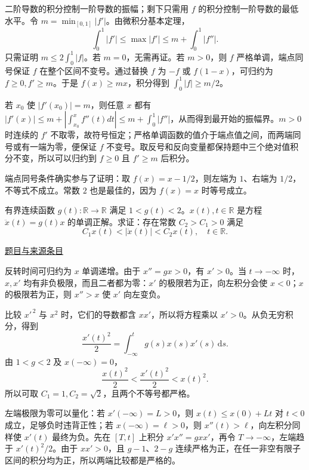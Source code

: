 \documentclass[UTF8,12pt,a4paper,fontset=fandol]{ctexart}
\begin{document}
\begin{solve}\label{ans:fin09-hi:7}

二阶导数的积分控制一阶导数的振幅；剩下只需用 $f$ 的积分控制一阶导数的最低水平。令 $m=\min_{[0,1]}|f'|$。由微积分基本定理，
\[
\int_0^1|f'|\leq\max|f'|\leq m+\int_0^1|f''|.
\]
只需证明 $m\leq2\int_0^1|f|$。若 $m=0$，无需再证。若 $m>0$，则 $f$ 严格单调，端点同号保证 $f$ 在整个区间不变号。通过替换 $f$ 为 $-f$ 或 $f(1-x)$，可归约为 $f\geq0,f'\geq m$。于是 $f(x)\geq mx$，积分得到 $\int_0^1|f|\geq m/2$。

若 $x_0$ 使 $|f'(x_0)|=m$，则任意 $x$ 都有 $|f'(x)|\le m+|\int_{x_0}^xf''(t)dt|\le m+\int_0^1|f''|$，从而得到最开始的振幅界。$m>0$ 时连续的 $f'$ 不取零，故符号恒定；严格单调函数的值介于端点值之间，而两端同号或有一端为零，便保证 $f$ 不变号。取反号和反向变量都保持题中三个绝对值积分不变，所以可以归约到 $f\ge0$ 且 $f'\ge m$ 后积分。

\end{solve}

\begin{remark}[方法与条件]端点同号条件确实参与了证明：取 $f(x)=x-1/2$，则左端为 $1$、右端为 $1/2$，不等式不成立。常数 $2$ 也是最佳的，因为 $f(x)=x$ 时等号成立。\end{remark}

\begin{example}\label{ex:fin09-lo:9}\label{pr:fin09-lo:9}

有界连续函数 $g(t): \mathbb{R} \rightarrow \mathbb{R}$ 满足 $1 < g(t) < 2$。$x(t), t \in \mathbb{R}$ 是方程 $\ddot{x}(t) = g(t)x$ 的单调正解。求证：存在常数 $C_2 > C_1 > 0$ 满足
\[
C_1 x(t) < |\dot{x}(t)| < C_2 x(t), \quad t \in \mathbb{R}.
\]

\par\href{https://github.com/lzxcr/cmc-mathematics/blob/64916fa1fdbc3e444a652eca204d5669058ee321/src/problems/finals/09/10.md}{题目与来源条目}

\end{example}

\begin{solve}\label{ans:fin09-lo:9}

反转时间可归约为 $x$ 单调递增。由于 $x''=gx>0$，有 $x'>0$。当 $t\to-\infty$ 时，$x,x'$ 均有非负极限，而且二者都为零：$x'$ 的极限若为正，向左积分会使 $x<0$；$x$ 的极限若为正，则 $x''>x$ 使 $x'$ 向左变负。

比较 $x'^{\,2}$ 与 $x^2$ 时，它们的导数都含 $xx'$，所以将方程乘以 $x'>0$。从负无穷积分，得到
\[
\frac{x'(t)^2}{2}=\int_{-\infty}^tg(s)x(s)x'(s)\,\mathrm ds.
\]
由 $1<g<2$ 及 $x(-\infty)=0$，
\[
\frac{x(t)^2}{2}<\frac{x'(t)^2}{2}<x(t)^2.
\]
所以可取 $C_1=1,C_2=\sqrt2$，且两个不等号都严格。

左端极限为零可以量化：若 $x'(-\infty)=L>0$，则 $x(t)\le x(0)+Lt$ 对 $t<0$ 成立，足够负时违背正性；若 $x(-\infty)=\ell>0$，则 $x''(t)>\ell$，向左积分同样使 $x'(t)$ 最终为负。先在 $[T,t]$ 上积分 $x'x''=gxx'$，再令 $T\to-\infty$，左端趋于 $x'(t)^2/2$。由于 $xx'>0$，且 $g-1$、$2-g$ 连续严格为正，在任一非空有限子区间的积分均为正，所以两端比较都是严格的。

\end{solve}
\end{document}
